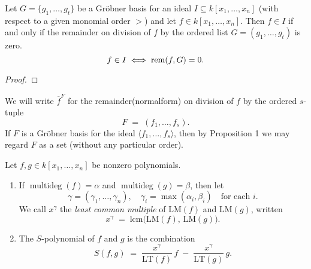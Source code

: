 \begin{corollary}\label{cor:GB_membership_test} %
    \leanok
    Let $G = \{g_1, \dots , g_t\}$ be a Gr{\"o}bner basis for an ideal $I \subseteq k[x_1, \dots , x_n]$
    (with respect to a given monomial order $>$) and let $f \in k[x_1, \dots , x_n]$.
    Then $f \in I$ if and only if the remainder on division of $f$ by the ordered list
    $G = (g_1, \dots, g_t)$ is zero.
    \[ f \in I \iff \operatorname{rem}(f, G) = 0. \]
\end{corollary}
\begin{proof}
  \leanok %
\end{proof}

\begin{definition}\label{def:Remainder} %
    \leanok %
    We will write \(\overline{f}^F\) for the remainder(normalform) on division of \(f\) by the ordered \(s\)-tuple
    \[
    F \;=\;(f_1,\dots,f_s).
    \]
    If \(F\) is a Gr{\"o}bner basis for the ideal \(\langle f_1,\dots,f_s\rangle\), then by Proposition 1
    we may regard \(F\) as a set (without any particular order).
\end{definition}

\begin{definition}\label{def:S-polynomial} %
    \leanok %
    Let \(f,g\in k[x_1,\dots,x_n]\) be nonzero polynomials.
    \begin{enumerate}
      \item If \(\operatorname{multideg}(f)=\alpha\) and \(\operatorname{multideg}(g)=\beta\), 
        then let 
        \[
          \gamma = (\gamma_1,\dots,\gamma_n),
          \quad
          \gamma_i = \max(\alpha_i,\beta_i)
          \quad\text{for each }i.
        \]
        We call \(x^\gamma\) the \emph{least common multiple} of \(\mathrm{LM}(f)\) and \(\mathrm{LM}(g)\),
        written
        \[
          x^\gamma \;=\;\mathrm{lcm}\bigl(\mathrm{LM}(f),\,\mathrm{LM}(g)\bigr).
        \]
      \item The \(S\)-polynomial of \(f\) and \(g\) is the combination
        \[
          S(f,g)
          \;=\;
          \frac{x^\gamma}{\mathrm{LT}(f)}\,f
          \;-\;
          \frac{x^\gamma}{\mathrm{LT}(g)}\,g.
        \]
    \end{enumerate}
\end{definition}

